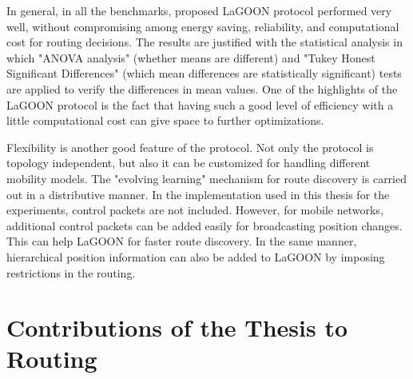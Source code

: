 \documentclass[12pt, oneandhalf, chaparabic, sees, ms]{metu}
\begin{document}
In general, in all the benchmarks, proposed LaGOON protocol performed very well, without compromising among energy saving, 
reliability, and computational cost for routing decisions. The results are justified with the statistical analysis in which
"ANOVA analysis" (whether means are different) and
"Tukey Honest Significant Differences" (which mean differences are statistically significant) tests are applied to verify the differences in mean values.
One of the highlights of the LaGOON protocol is the fact that having 
such a good level of efficiency with a little computational cost can give space to further optimizations. 

Flexibility is another 
good feature of the protocol. Not only the protocol is topology independent, but also it can be customized for 
handling different mobility models. The "evolving learning" mechanism for route discovery is carried out in a distributive manner.
In the implementation used in this thesis for the experiments, control packets are not included. However, for mobile networks, additional
control packets can be added easily for broadcasting position changes. This can help LaGOON for faster route discovery. In the same manner, 
hierarchical position information can also be added to LaGOON by imposing restrictions in the routing.
 
% 
% 
% 







\newpage
\section{Contributions of the Thesis to Routing}\label{scontribrouting}
\end{document}
